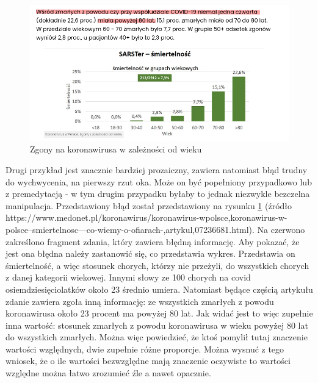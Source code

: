 \documentclass{classrep}
\begin{document}
\begin{figure}
    \centering
    \includegraphics[width=1\textwidth,keepaspectratio]{img/wzgledne_wzgledne.png}
    \caption{Zgony na koronawirusa w zależności od wieku}
    \label{wzgledne_wzgledne}
\end{figure}

Drugi przykład jest znacznie bardziej prozaiczny, zawiera natomiast błąd trudny do wychwycenia, na
pierwszy rzut oka. Może on być popełniony przypadkowo lub z premedytacją - w tym drugim przypadku
byłaby to jednak niezwykle bezczelna manipulacja. Przedstawiony błąd został przedstawiony na rysunku
\ref{wzgledne_wzgledne} (źródło
https://www.medonet.pl/koronawirus/koronawirus-w\-polsce,koronawirus-w-polsce--smiertelnosc---co-wiemy-o-ofiarach-,artykul,07236681.html).
Na czerwono zakreślono fragment zdania, który zawiera błędną informację.  Aby pokazać, że jest ona
błędna należy zastanowić się, co przedstawia wykres. Przedstawia on śmiertelność, a więc stosunek
chorych, którzy nie przeżyli, do wszystkich chorych z danej kategorii wiekowej. Innymi słowy ze 100
chorych na covid osiemdziesięciolatków około 23 średnio umiera.  Natomiast będące częścią artykułu
zdanie zawiera zgoła inną informację: ze wszystkich zmarłych z powodu koronawirusa około 23 procent
ma powyżej 80 lat. Jak widać jest to więc zupełnie inna wartość: stosunek zmarłych z powodu
koronawirusa w wieku powyżej 80 lat do wszystkich zmarłych.  Można więc powiedzieć, że ktoś pomylił
tutaj znaczenie wartości względnych, dwie zupełnie różne proporcje. Można wysnuć z tego wniosek, że
o ile wartości bezwzględne mają znaczenie oczywiste to wartości względne można łatwo zrozumieć źle a
nawet opacznie.
\end{document}
